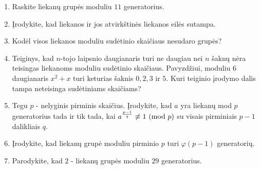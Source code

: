 \begin{enumerate}
  \item Raskite liekanų grupės moduliu $11$ generatorius.
  \item Įrodykite, kad liekanos ir jos atvirkštinės liekanos eilės sutampa.
  \item Kodėl visos liekanos moduliu sudėtinio skaičiaus nesudaro grupės?
  \item Teiginys, kad $n$-tojo laipsnio daugianaris turi ne daugiau nei $n$
    šaknų nėra teisingas liekanoms moduliu sudėtinio skaičiaus.  Pavyzdžiui,
    moduliu $6$ daugianaris $x^2 + x$ turi keturias šaknis $0, 2, 3$ ir $5$.
    Kuri teiginio įrodymo dalis tampa neteisinga sudėtiniams skaičiams?
  \item Tegu $p$ - nelyginis pirminis skaičius. Įrodykite, kad $a$ yra
    liekanų mod $p$ generatorius tada ir tik tada, kai $a^{\frac{p-1}{q}} \not
    \equiv 1 \ (\text{mod } p)$ su visais pirminiais $p-1$ dalikliais $q$. 
  \item Įrodykite, kad liekanų grupė moduliu pirminio $p$ turi
    $\varphi(p-1)$ generatorių.
  \item Parodykite, kad $2$ - liekanų grupės moduliu $29$ generatorius.

\end{enumerate}
